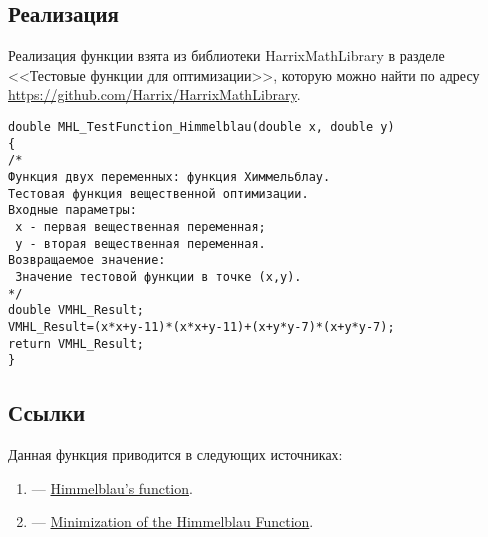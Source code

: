 \subsection {Реализация}

Реализация функции взята из библиотеки HarrixMathLibrary в разделе <<Тестовые функции для оптимизации>>, которую можно найти по адресу \href{https://github.com/Harrix/HarrixMathLibrary} {https://github.com/Harrix/HarrixMathLibrary}.

\begin{lstlisting}[caption=Код функции MHL\_TestFunction\_Himmelblau]
double MHL_TestFunction_Himmelblau(double x, double y)
{
/*
Функция двух переменных: функция Химмельблау.
Тестовая функция вещественной оптимизации.
Входные параметры:
 x - первая вещественная переменная;
 y - вторая вещественная переменная.
Возвращаемое значение:
 Значение тестовой функции в точке (x,y).
*/
double VMHL_Result;
VMHL_Result=(x*x+y-11)*(x*x+y-11)+(x+y*y-7)*(x+y*y-7);
return VMHL_Result;
}
\end{lstlisting}

\subsection {Ссылки}

Данная функция приводится в следующих источниках:

\begin{enumerate}
\item \cite{web:Himmelblausfunction} ---  \href{http://en.wikipedia.org/wiki/Himmelblau's_function}{Himmelblau's function}.
\item \cite{web:MinimizationOfTheHimmelblauFunction} ---  \href{http://pythonhosted.org/algopy/examples/minimization/himmelblau_minimization.html}{Minimization of the Himmelblau Function}.
\end{enumerate}